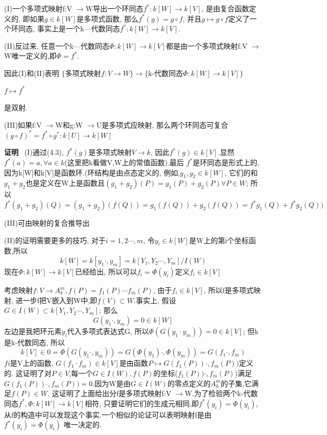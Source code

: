 \documentclass[UTF8]{book}
\begin{document}
(I)一个多项式映射f:V $\rightarrow $W导出一个环同态$f^{*}:k[W]\rightarrow k[V]$, 是由复合函数定义的, 即如果$g\in k[W]$是多项式函数, 那么$f^{*}(g)=g\circ f$, 并且$g\mapsto g\circ f$定义了一个环同态, 事实上是一个k—代数同态$f^{*}:k[W]\rightarrow k[V]$.

(II)反过来, 任意一个k—代数同态$\Phi:k[W]\rightarrow k[V]$都是由一个多项式映射f:V $\rightarrow $W唯一定义的,即$\Phi=f^{*}$.

因此(I)和(II)表明
\center  $\{$多项式映射$f:V \rightarrow W \}\longrightarrow $$\{$k-代数同态$\Phi:k[W]\rightarrow k[V]\}$



      $ f \longmapsto f^{*}$

\justifying


是双射.

(III)如果f:V $\rightarrow $W和g:W $\rightarrow $U是多项式应映射, 那么两个环同态可复合$(g\circ f)^{*}=f^{*}\circ g^{*}:k[U]\rightarrow k[W]$

\textbf{证明} \ (I)通过(4.3), $f^{*}(g)$是多项式映射$V\rightarrow k$, 因此$f^{*}(g)\in k[V]$.显然 $f^{*}(a)=a, \forall a\in k$(这里把k看做V,W上的常值函数).最后 $f^{*}$是环同态是形式上的, 因为k[W]和k[V]是函数环.(环结构是由点态定义的, 例如,$g_{1},g_{2}\in k[W]$, 它们的和 $g_{1}+g_{2}$也是定义在W上是函数且$(g_{1}+g_{2})(P)=g_{1}(P)+g_{2}(P) \forall P\in W$; 所以$f^{*}(g_{1}+g_{2})(Q)=(g_{1}+g_{2})(f(Q))= g_{1}(f(Q))+g_{2}(f(Q))= f^{*}g_{1}(Q)+f^{*}g_{2}(Q))$

(III)可由映射的复合推导出

(II)的证明需要更多的技巧, 对于$i=1,2\cdots,m$, 令$y_{i}\in k[W]$是W上的第i个坐标函数,所以
\begin{equation*}
k[W]=k[y_{1}  \cdot, y_{m}]=k[Y_{1},Y_{2} \cdots,Y_{m}]/I(W)
\end{equation*}
现在$\Phi:k[W]\rightarrow k[V]$已经给出, 所以可以$f_{i}=\Phi(y_{i})$定义$f_{i}\in k[V]$

考虑映射$f:V \rightarrow A^{m}_{k}, f(P)=f_{1}(P)\cdots f_{m}(P)$, 由于$f_{i}\in k[V]$, 所以f是多项式映射, 进一步f把V嵌入到W中,即$f(V)\subset W$.事实上, 假设$G\in I(W)\subset k[Y_{1},Y_{2}\cdots,Y_{m}]$; 那么
\begin{equation*}
G(y_{1}\cdot ,y_{m})=0\in k[W]
\end{equation*}
左边是我把环元素$y_{i}$代入多项式表达式G, 所以$\Phi(G(y_{1}\cdot y_{m}))=0\in k[V]$; 但k是k-代数同态, 所以
\begin{equation*}
k[V]\in0=\Phi(G(y_{1}\cdot, y_{m}))=G(\Phi(y_{1})\cdot ,\Phi(y_{m}))=G(f_{1}\cdot ,f_{m})
\end{equation*}
$f{i}$是V上的函数, $G(f_{1}\cdot f_{m})\in k[V]$是由函数$P\mapsto G(f_{1}(P))\cdot ,f_{m}(P))$定义的. 这证明了对$P\in V$,每一个$G\in I(W),f(P)$的坐标($f_{1}(P))\cdot ,f_{m}(P)$)满足$G(f_{1}(P))\cdot ,f_{m}(P))=0$.因为W是由$G\in I(W)$的零点定义的$A^{m}_{k}$的子集,它满足$f(P)\in W$. 这证明了上面给出分f是多项式映射f:V $\rightarrow $W.为了检验两个k-代数同态$f^{*},\Phi:k[W]\rightarrow k[V]$相符, 只要证明它们的生成元相同,即$f^{*}(y_{i})=\Phi(y_{i})$,从f的构造中可以发现这个事实.一个相似的论证可以表明映射f是由$f^{*}(y_{i})=\Phi(y_{i})$  唯一决定的.
\end{document}
